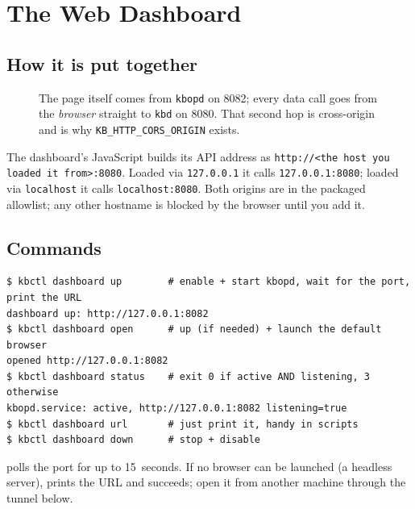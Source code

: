 \chapter{The Web Dashboard}
\label{ch:dash}
\section{How it is put together}
\begin{figure}[ht]
\centering
{}
\caption{The page itself comes from \texttt{kbopd} on 8082; every data call goes from the \emph{browser}
straight to \texttt{kbd} on 8080. That second hop is cross-origin and is why \texttt{KB\_HTTP\_CORS\_ORIGIN}
exists.}
\end{figure}
The dashboard's JavaScript builds its API address as \texttt{http://<the host you loaded it from>:8080}.
Loaded via \texttt{127.0.0.1} it calls \texttt{127.0.0.1:8080}; loaded via \texttt{localhost} it calls
\texttt{localhost:8080}. Both origins are in the packaged allowlist; any other hostname is blocked by the
browser until you add it.

\section{Commands}
\begin{lstlisting}[style=console]
$ kbctl dashboard up        # enable + start kbopd, wait for the port, print the URL
dashboard up: http://127.0.0.1:8082
$ kbctl dashboard open      # up (if needed) + launch the default browser
opened http://127.0.0.1:8082
$ kbctl dashboard status    # exit 0 if active AND listening, 3 otherwise
kbopd.service: active, http://127.0.0.1:8082 listening=true
$ kbctl dashboard url       # just print it, handy in scripts
$ kbctl dashboard down      # stop + disable
\end{lstlisting}
 polls the port for up to 15~seconds. If no browser can be launched (a headless server),
 prints the URL and succeeds; open it from another machine through the tunnel below.

